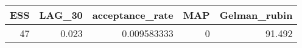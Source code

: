 \begin{longtable}{rrrrr}
\toprule
ESS & LAG\_30 & acceptance\_rate & MAP & Gelman\_rubin \\ 
\midrule
47 & 0.023 & 0.009583333 & 0 & 91.492 \\ 
\bottomrule
\end{longtable}

